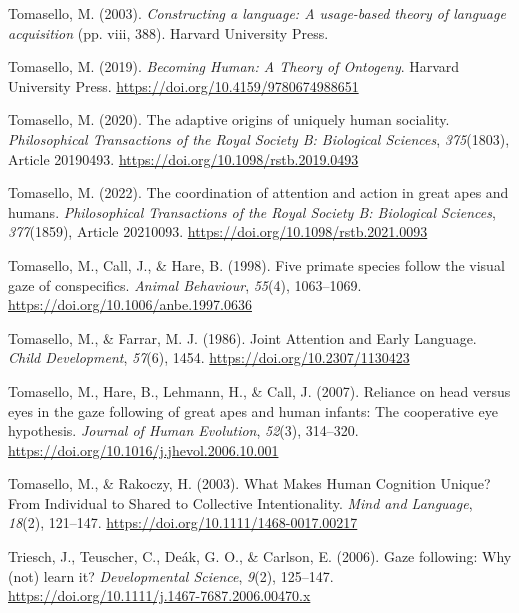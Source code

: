 \documentclass[
]{scrbook}
\newlength{\cslhangindent}
\newenvironment{CSLReferences}[2] %
 {\begin{list}{}{%
  \setlength{\itemindent}{0pt}
  \setlength{\leftmargin}{0pt}
  \setlength{\parsep}{0pt}
  \ifodd #1
   \setlength{\leftmargin}{\cslhangindent}
   \setlength{\itemindent}{-1\cslhangindent}
  \fi
  \setlength{\itemsep}{#2\baselineskip}}}
 {\end{list}}
\begin{document}
\begin{CSLReferences}{1}{0}
Tomasello, M. (2003). \emph{Constructing a language: {A} usage-based theory of language acquisition} (pp. viii, 388). Harvard University Press.

Tomasello, M. (2019). \emph{Becoming {Human}: {A Theory} of {Ontogeny}}. Harvard University Press. \url{https://doi.org/10.4159/9780674988651}

Tomasello, M. (2020). The adaptive origins of uniquely human sociality. \emph{Philosophical Transactions of the Royal Society B: Biological Sciences}, \emph{375}(1803), Article 20190493. \url{https://doi.org/10.1098/rstb.2019.0493}

Tomasello, M. (2022). The coordination of attention and action in great apes and humans. \emph{Philosophical Transactions of the Royal Society B: Biological Sciences}, \emph{377}(1859), Article 20210093. \url{https://doi.org/10.1098/rstb.2021.0093}

Tomasello, M., Call, J., \& Hare, B. (1998). Five primate species follow the visual gaze of conspecifics. \emph{Animal Behaviour}, \emph{55}(4), 1063--1069. \url{https://doi.org/10.1006/anbe.1997.0636}

Tomasello, M., \& Farrar, M. J. (1986). Joint {Attention} and {Early Language}. \emph{Child Development}, \emph{57}(6), 1454. \url{https://doi.org/10.2307/1130423}

Tomasello, M., Hare, B., Lehmann, H., \& Call, J. (2007). Reliance on head versus eyes in the gaze following of great apes and human infants: The cooperative eye hypothesis. \emph{Journal of Human Evolution}, \emph{52}(3), 314--320. \url{https://doi.org/10.1016/j.jhevol.2006.10.001}

Tomasello, M., \& Rakoczy, H. (2003). What {Makes Human Cognition Unique}? {From Individual} to {Shared} to {Collective Intentionality}. \emph{Mind and Language}, \emph{18}(2), 121--147. \url{https://doi.org/10.1111/1468-0017.00217}

Triesch, J., Teuscher, C., Deák, G. O., \& Carlson, E. (2006). Gaze following: Why (not) learn it? \emph{Developmental Science}, \emph{9}(2), 125--147. \url{https://doi.org/10.1111/j.1467-7687.2006.00470.x}


\end{CSLReferences}
\end{document}

